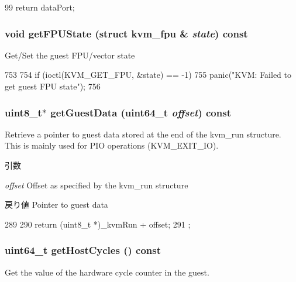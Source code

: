 \begin{DoxyCode}
99 { return dataPort; }
\end{DoxyCode}
\hypertarget{classBaseKvmCPU_a9fdafd736b7b9ef041b6c3e4768a61d6}{
\subsubsection[{getFPUState}]{\setlength{\rightskip}{0pt plus 5cm}void getFPUState (struct kvm\_\-fpu \& {\em state}) const}}
\label{classBaseKvmCPU_a9fdafd736b7b9ef041b6c3e4768a61d6}
Get/Set the guest FPU/vector state 


\begin{DoxyCode}
753 {
754     if (ioctl(KVM_GET_FPU, &state) == -1)
755         panic("KVM: Failed to get guest FPU state\n");
756 }
\end{DoxyCode}
\hypertarget{classBaseKvmCPU_a0e5c1a55b7cce45487f5778ee272acdf}{
\subsubsection[{getGuestData}]{\setlength{\rightskip}{0pt plus 5cm}uint8\_\-t$\ast$ getGuestData (uint64\_\-t {\em offset}) const}}
\label{classBaseKvmCPU_a0e5c1a55b7cce45487f5778ee272acdf}
Retrieve a pointer to guest data stored at the end of the kvm\_\-run structure. This is mainly used for PIO operations (KVM\_\-EXIT\_\-IO).


\begin{DoxyParams}{引数}
\item[{\em offset}]Offset as specified by the kvm\_\-run structure \end{DoxyParams}
\begin{DoxyReturn}{戻り値}
Pointer to guest data 
\end{DoxyReturn}



\begin{DoxyCode}
289                                                  {
290         return (uint8_t *)_kvmRun + offset;
291     };
\end{DoxyCode}
\hypertarget{classBaseKvmCPU_abcad2a22057ba48360b17b978f694b48}{
\subsubsection[{getHostCycles}]{\setlength{\rightskip}{0pt plus 5cm}uint64\_\-t getHostCycles () const}}
\label{classBaseKvmCPU_abcad2a22057ba48360b17b978f694b48}
Get the value of the hardware cycle counter in the guest.

